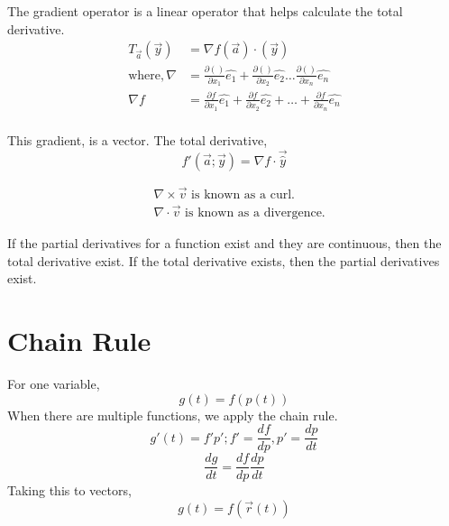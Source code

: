 \documentclass[twoside]{report}
\begin{document}
\begin{definition}
   The gradient operator is a linear operator that helps calculate the total derivative.
\begin{align*}
   T_{\vec{a}}(\vec{y}) &= \nabla f(\vec{a}) \cdot (\vec{y}) \\
   \text{where}, \nabla &= \frac{\partial ()}{\partial x_1} \hat{e_1} + \frac{\partial ()}{\partial x_2} \hat{e_2} \dots \frac{\partial ()}{\partial x_n} \hat{e_n} \\
   \nabla f &= \frac{\partial f}{\partial x_1}\hat{e_1} + \frac{\partial f}{\partial x_2} \hat{e_2} + \dots + \frac{\partial f}{\partial x_n} \hat{e_n} \\
\end{align*}
\end{definition}
This gradient, is a vector.
The total derivative, 
\[
   f'(\vec{a};\vec{y}) = \nabla f \cdot \vec{\hat{y}}
\]
\begin{note}
   \begin{align*}
      &\nabla \times \vec{v} \text{ is known as a curl.}\\
      &\nabla \cdot \vec{v} \text{ is known as a divergence.}
   \end{align*}
	 
\end{note}
If the partial derivatives for a function exist and they are continuous, then the total derivative exist. If the total derivative exists, then the partial derivatives exist.

\section{Chain Rule}
For one variable, 
\[
	g(t) = f(p(t))
\]
When there are multiple functions, we apply the chain rule.
\[
   g'(t) = f' p' ; f' = \frac{df}{dp}, p' = \frac{dp}{dt}
\]
\[
   \frac{dg}{dt} = \frac{df}{dp} \frac{dp}{dt}
\]
Taking this to vectors,
\[
   g(t) = f(\vec{r}(t))
\]
\end{document}
